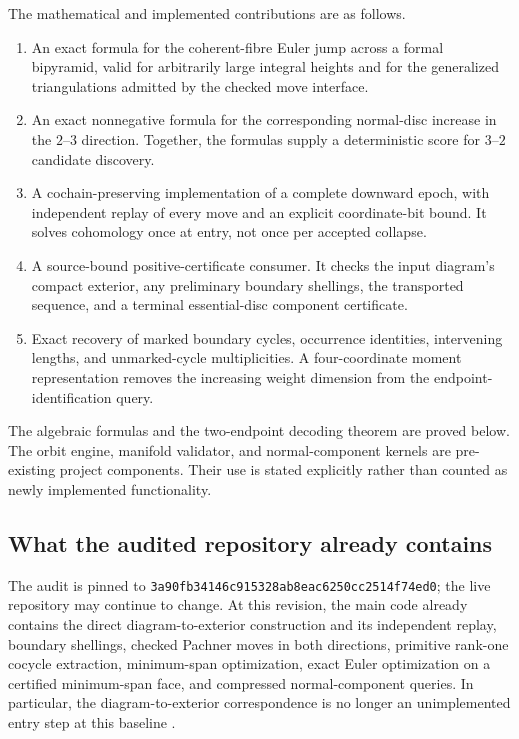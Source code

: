 \documentclass[11pt,letterpaper]{article}
\theoremstyle{definition}
\theoremstyle{remark}
\newcommand{\baseline}{3a90fb34146c915328ab8eac6250cc2514f74ed0}
\begin{document}
The mathematical and implemented contributions are as follows.
\begin{enumerate}
\item An exact formula for the coherent-fibre Euler jump across a formal
bipyramid, valid for arbitrarily large integral heights and for the
generalized triangulations admitted by the checked move interface.
\item An exact nonnegative formula for the corresponding normal-disc
increase in the $2$--$3$ direction. Together, the formulas supply a
deterministic score for $3$--$2$ candidate discovery.
\item A cochain-preserving implementation of a complete downward epoch,
with independent replay of every move and an explicit coordinate-bit bound.
It solves cohomology once at entry, not once per accepted collapse.
\item A source-bound positive-certificate consumer. It checks the input
diagram's compact exterior, any preliminary boundary shellings, the
transported sequence, and a terminal essential-disc component certificate.
\item Exact recovery of marked boundary cycles, occurrence identities,
intervening lengths, and unmarked-cycle multiplicities. A four-coordinate
moment representation removes the increasing weight dimension from the
endpoint-identification query.
\end{enumerate}

The algebraic formulas and the two-endpoint decoding theorem are proved
below. The orbit engine, manifold validator, and normal-component kernels
are pre-existing project components. Their use is stated explicitly rather
than counted as newly implemented functionality.

\subsection{What the audited repository already contains}

The audit is pinned to \texttt{\baseline}; the live repository may continue
to change. At this revision, the main code already contains the direct
diagram-to-exterior construction and its independent replay, boundary
shellings, checked Pachner moves in both directions, primitive rank-one
cocycle extraction, minimum-span optimization, exact Euler optimization
on a certified minimum-span face, and compressed normal-component queries.
In particular, the diagram-to-exterior correspondence is no longer an
unimplemented entry step at this baseline \cite{ProveIt}.
\end{document}
